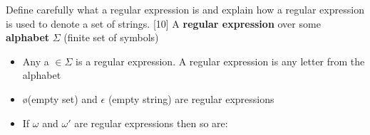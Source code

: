 \documentclass[grid,avery5388]{flashcards}
\begin{document}
\begin{flashcard}[]{Define carefully what a regular expression is and explain how a regular expression is used to denote a set of strings. [10]}
A \textbf{regular expression} over some \textbf{alphabet} $\Sigma$ (finite set of symbols)
\begin{itemize}
\item Any a $\in \Sigma$ is a regular expression. A regular expression is any letter from the alphabet
\item \o (empty set) and $\epsilon$ (empty string) are regular expressions
\item If $\omega$ and $\omega'$ are regular expressions then so are:
\end{itemize}
\end{flashcard}
\end{document}
